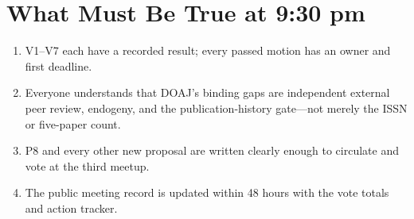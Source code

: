 \documentclass[11pt]{article}
\begin{document}
\section*{What Must Be True at 9:30 pm}

\begin{enumerate}
\item V1--V7 each have a recorded result; every passed motion has an owner and first deadline.
\item Everyone understands that DOAJ's binding gaps are independent external peer review, endogeny, and the publication-history gate---not merely the ISSN or five-paper count.
\item P8 and every other new proposal are written clearly enough to circulate and vote at the third meetup.
\item The public meeting record is updated within 48 hours with the vote totals and action tracker.
\end{enumerate}

\end{document}
